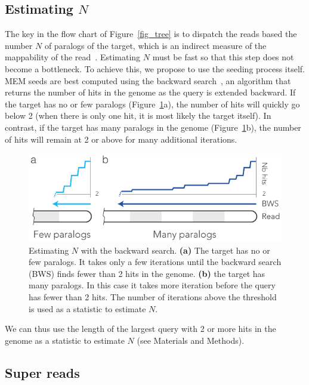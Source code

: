 \documentclass[a4,center,fleqn]{NAR}
\begin{document}
\subsection{Estimating $N$}
\label{sec_N}

The key in the flow chart of Figure~\ref{fig_tree} is to dispatch the
reads based the number $N$ of paralogs of the target, which is an
indirect measure of the mappability of the read~\cite{pmid22276185}.
Estimating $N$ must be fast so that this step does not become a
bottleneck. To achieve this, we propose to use the seeding process itself.
MEM seeds are best computed using the backward
search~\cite{ferragina2000opportunistic}, an algorithm that returns the
number of hits in the genome as the query is extended backward. If the
target has no or few paralogs (Figure~\ref{fig_back}a), the number of hits
will quickly go below 2 (when there is only one hit, it is most likely the
target itself). In contrast, if the target has many paralogs in the genome
(Figure~\ref{fig_back}b), the number of hits will remain at 2 or above for
many additional iterations.

\begin{figure}[t]
\begin{center}
\includegraphics[scale=.84]{pushing_backward.pdf}
\end{center}
\caption{Estimating $N$ with the backward search. \textbf{(a)} The target
has no or few paralogs. It takes only a few iterations until the backward
search (BWS) finds fewer than 2 hits in the genome. \textbf{(b)} the
target has many paralogs. In this case it takes more iteration before the
query has fewer than 2 hits. The number of iterations above the threshold
is used as a statistic to estimate $N$.}
\label{fig_back}
\end{figure}

We can thus use the length of the largest query with 2 or more hits in the
genome as a statistic to estimate $N$ (see Materials and Methods).


\subsection{Super reads}
\label{sec_super}
\end{document}
